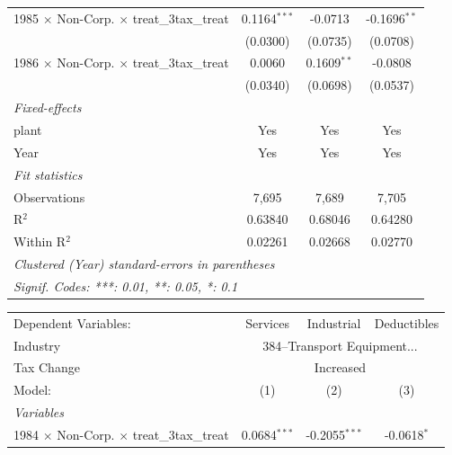\documentclass[
  12pt]{article}
\theoremstyle{definition}
\theoremstyle{remark}
\begin{document}
\begin{table}
\begin{minipage}{\linewidth}
\begin{tabular}{lccc}
   1985 $\times$ Non-Corp. $\times$ treat\_3tax\_treat     & 0.1164$^{***}$ & -0.0713       & -0.1696$^{**}$\\   
                                                           & (0.0300)       & (0.0735)      & (0.0708)\\   
   1986 $\times$ Non-Corp. $\times$ treat\_3tax\_treat     & 0.0060         & 0.1609$^{**}$ & -0.0808\\   
                                                           & (0.0340)       & (0.0698)      & (0.0537)\\   
   \midrule
   \emph{Fixed-effects}\\
   plant                                                   & Yes            & Yes           & Yes\\  
   Year                                                    & Yes            & Yes           & Yes\\  
   \midrule
   \emph{Fit statistics}\\
   Observations                                            & 7,695          & 7,689         & 7,705\\  
   R$^2$                                                   & 0.63840        & 0.68046       & 0.64280\\  
   Within R$^2$                                            & 0.02261        & 0.02668       & 0.02770\\  
   \midrule \midrule
   \multicolumn{4}{l}{\emph{Clustered (Year) standard-errors in parentheses}}\\
   \multicolumn{4}{l}{\emph{Signif. Codes: ***: 0.01, **: 0.05, *: 0.1}}\\
\end{tabular}
\par\endgroup
\begingroup
\centering
\begin{tabular}{lccc}
   \tabularnewline \midrule \midrule
   Dependent Variables:                                    & Services       & Industrial      & Deductibles\\  
   Industry & \multicolumn{3}{c}{384–Transport Equipment...} \\ 
   Tax Change & \multicolumn{3}{c}{Increased} \\ 
   Model:                                                  & (1)            & (2)             & (3)\\  
   \midrule
   \emph{Variables}\\
   1984 $\times$ Non-Corp. $\times$ treat\_3tax\_treat     & 0.0684$^{***}$ & -0.2055$^{***}$ & -0.0618$^{*}$\\   

\end{tabular}
\end{minipage}
\end{table}
\end{document}
